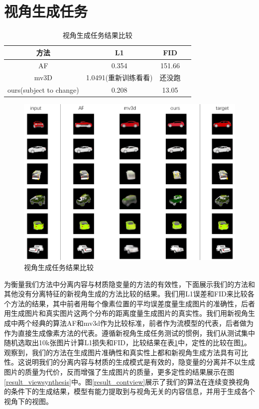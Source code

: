 \documentclass[UTF8,openany,AutoFakeBold,AutoFakeSlant,cs4size]{ctexbook}
\begin{document}
\section{视角生成任务}

\begin{table}[h]
\small %
\centering
\caption{视角生成任务结果比较}
\label{novel_view_thesis}
\begin{tabular}{cccc} %
\toprule %
方法 & L1 & FID \\
\midrule
AF\cite{Zhou2016ViewSB} & 0.354 & 151.66 \\
mv3D\cite{Su2015MultiviewCN} & 1.0491(重新训练看看) & 还没跑 \\
ours(subject to change) & 0.208 & 13.05 \\
\bottomrule
\end{tabular}
\end{table}

\begin{figure}
\centering
\includegraphics[width=\linewidth]{./images/compare_methods.png}
\caption{视角生成任务结果比较}
\label{compare_methods}
\end{figure}

为衡量我们方法中分离内容与材质隐变量的方法的有效性，下面展示我们的方法和其他没有分离特征的新视角生成的方法比较的结果。我们用L1误差和FID来比较各个方法的结果，其中前者用每个像素位置的平均误差度量生成图片的准确性，后者用生成图片和真实图片这两个分布的距离度量生成图片的真实性。我们用新视角生成中两个经典的算法AF\cite{Zhou2016ViewSB}和mv3d\cite{TDB16a}作为比较标准，前者作为流模型的代表，后者做为作为直接生成像素方法的代表。遵循新视角生成任务测试的惯例，我们从测试集中随机选取出10k张图片计算L1损失和FID，比较结果在表\ref{novel_view_thesis}中，定性的比较在图\ref{compare_methods}。观察到，我们的方法在生成图片准确性和真实性上都和新视角生成方法具有可比性。这说明我们的分离内容与材质的生成模式是有效的，隐变量的分离并不以生成图片的质量为代价，反而增强了生成图片的质量，更多定性的结果展示在图\ref{result_viewsynthesis}中。图\ref{result_contview}展示了我们的算法在连续变换视角的条件下的生成结果，模型有能力提取到与视角无关的内容信息，并用于生成各个视角下的视图。
\end{document}
